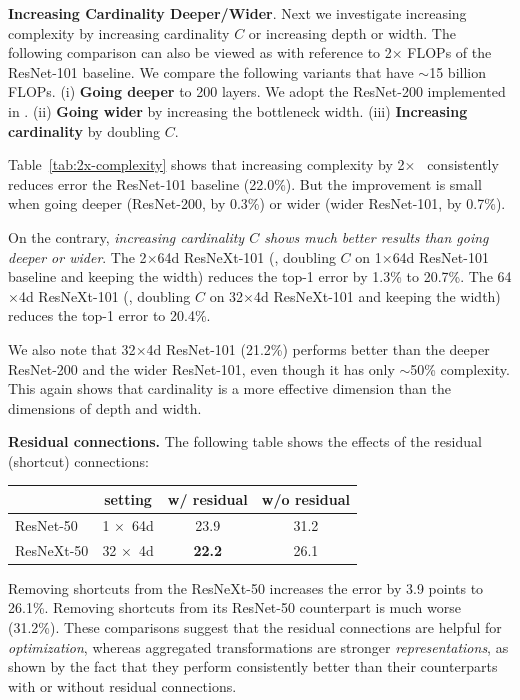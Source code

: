 \documentclass[10pt,twocolumn,letterpaper]{article}
\newcommand{\m}{$\times$}
\begin{document}
\vspace{.5em}
\noindent\textbf{Increasing Cardinality \vs Deeper/Wider}.
Next we investigate increasing complexity by increasing cardinality $C$ or increasing depth or width. The following comparison can also be viewed as with reference to 2$\times$ FLOPs of the ResNet-101 baseline. We compare the following variants that have $\sim$15 billion FLOPs.
(i) \textbf{Going deeper} to 200 layers. We adopt the ResNet-200 \cite{He2016a} implemented in \cite{Gross2016}. (ii) \textbf{Going wider} by increasing the bottleneck width. (iii) \textbf{Increasing cardinality} by doubling $C$.

Table~\ref{tab:2x-complexity} shows that increasing complexity by 2\m~ consistently reduces error \vs the ResNet-101 baseline (22.0\%). But the improvement is small when going deeper (ResNet-200, by 0.3\%) or wider (wider ResNet-101, by 0.7\%).

On the contrary, \emph{increasing cardinality $C$ shows much better results than going deeper or wider}. The 2\m64d ResNeXt-101 (\ie, doubling $C$ on 1\m64d ResNet-101 baseline and keeping the width) reduces the top-1 error by 1.3\% to 20.7\%. The 64\m4d ResNeXt-101 (\ie, doubling $C$ on 32\m4d ResNeXt-101 and keeping the width) reduces the top-1 error to 20.4\%.

We also note that 32\m4d ResNet-101 (21.2\%) performs better than the deeper ResNet-200 and the wider ResNet-101, even though it has only $\sim$50\% complexity. This again shows that cardinality is a more effective dimension than the dimensions of depth and width.

\vspace{.5em}
\noindent\textbf{Residual connections.}
The following table shows the effects of the residual (shortcut) connections:
{
\renewcommand\arraystretch{1.05}
\begin{center}
\small
\begin{tabular}{l|c|c|c}
\hline
	& \footnotesize {setting}
	& \footnotesize  {w/ residual}
	& \footnotesize  {w/o residual} \\
\hline
ResNet-50		& 1 \m~64d		& 23.9 & 31.2 \\
ResNeXt-50		& 32 \m~4d		& \textbf{22.2} & 26.1 \\
\hline
\end{tabular}
\end{center}
}
\noindent
Removing shortcuts from the ResNeXt-50 increases the error by 3.9 points to 26.1\%. Removing shortcuts from its ResNet-50 counterpart is much worse (31.2\%). These comparisons suggest that the residual connections are helpful for \emph{optimization},
whereas aggregated transformations are stronger \emph{representations}, as shown by the fact that they perform consistently better than their counterparts with or without residual connections.
\end{document}
